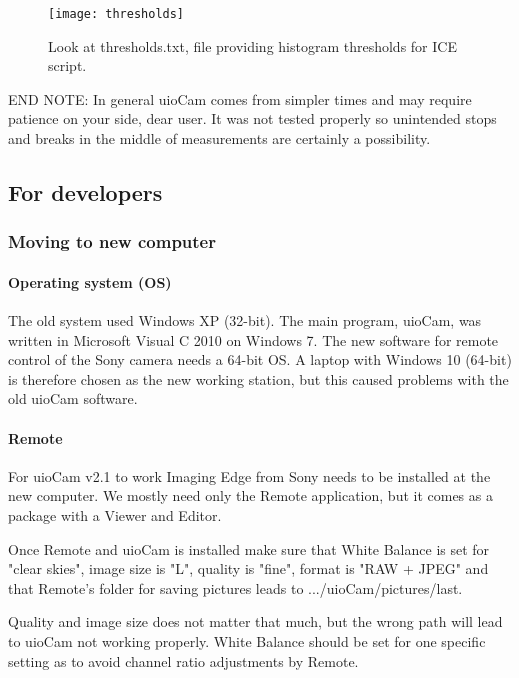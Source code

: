 \documentclass[]{book}
\begin{document}
	\begin{figure}
		\centering
		\texttt{[image: thresholds]}
		\label{fig: thresholds}
		\caption{Look at thresholds.txt, file providing histogram thresholds for ICE script.}
	\end{figure}
	
	END NOTE: In general uioCam comes from simpler times and may require patience on your side, dear user. It was not tested properly so unintended stops and breaks in the middle of measurements are certainly a possibility.
	
	\subsection{For developers}
	
	\subsubsection{Moving to new computer}\label{sec: moving uioCam}
	
	\paragraph{Operating system (OS)}
	The old system used Windows XP (32-bit). The main program, uioCam, was written in Microsoft Visual C 2010 on Windows 7. The new software for remote control of the Sony camera needs a 64-bit OS. A laptop with Windows 10 (64-bit) is therefore chosen as the new working station, but this caused problems with the old uioCam software.
	
	\paragraph{Remote}
	For uioCam v2.1 to work Imaging Edge from Sony needs to be installed at the new computer. We mostly need only the Remote application, but it comes as a package with a Viewer and Editor.
	
	Once Remote and uioCam is installed make sure that White Balance is set for "clear skies", image size is "L", quality is "fine", format is "RAW + JPEG" and that Remote's folder for saving pictures leads to .../uioCam/pictures/last.
	
	Quality and image size does not matter that much, but the wrong path will lead to uioCam not working properly. White Balance should be set for one specific setting as to avoid channel ratio adjustments by Remote.
	
\end{document}
